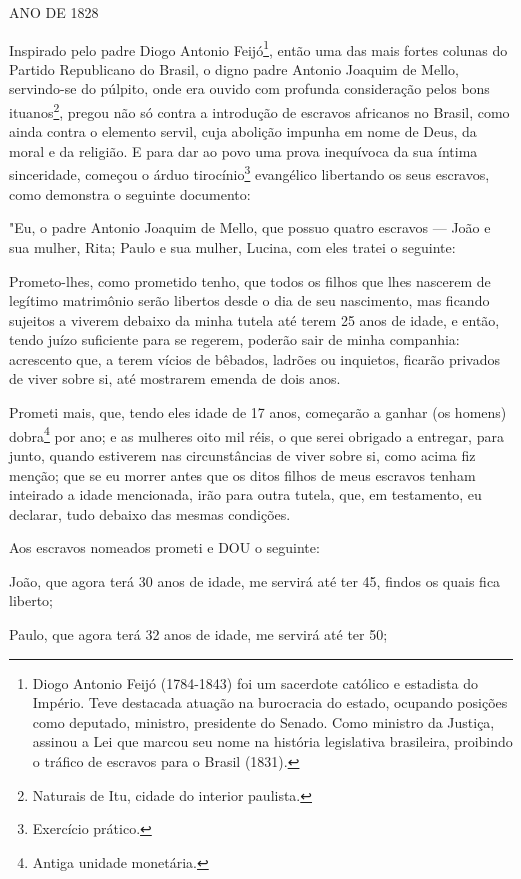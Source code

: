 ANO DE 1828

Inspirado pelo padre Diogo Antonio Feijó\footnote{Diogo Antonio Feijó
  (1784-1843) foi um sacerdote católico e estadista do Império. Teve
  destacada atuação na burocracia do estado, ocupando posições como
  deputado, ministro, presidente do Senado. Como ministro da Justiça,
  assinou a Lei que marcou seu nome na história legislativa brasileira,
  proibindo o tráfico de escravos para o Brasil (1831).}, então uma das
mais fortes colunas do Partido Republicano do Brasil, o digno padre
Antonio Joaquim de Mello, servindo-se do púlpito, onde era ouvido com
profunda consideração pelos bons ituanos\footnote{Naturais de Itu,
  cidade do interior paulista.}, pregou não só contra a introdução de
escravos africanos no Brasil, como ainda contra o elemento servil, cuja
abolição impunha em nome de Deus, da moral e da religião. E para dar ao
povo uma prova inequívoca da sua íntima sinceridade, começou o árduo
tirocínio\footnote{Exercício prático.} evangélico libertando os seus
escravos, como demonstra o seguinte documento:

"Eu, o padre Antonio Joaquim de Mello, que possuo quatro escravos ---
João e sua mulher, Rita; Paulo e sua mulher, Lucina, com eles tratei o
seguinte:

Prometo-lhes, como prometido tenho, que todos os filhos que lhes
nascerem de legítimo matrimônio serão libertos desde o dia de seu
nascimento, mas ficando sujeitos a viverem debaixo da minha tutela até
terem 25 anos de idade, e então, tendo juízo suficiente para se regerem,
poderão sair de minha companhia: acrescento que, a terem vícios de
bêbados, ladrões ou inquietos, ficarão privados de viver sobre si, até
mostrarem emenda de dois anos.

Prometi mais, que, tendo eles idade de 17 anos, começarão a ganhar (os
homens) dobra\footnote{Antiga unidade monetária.} por ano; e as
mulheres oito mil réis, o que serei obrigado a entregar, para junto,
quando estiverem nas circunstâncias de viver sobre si, como acima fiz
menção; que se eu morrer antes que os ditos filhos de meus escravos
tenham inteirado a idade mencionada, irão para outra tutela, que, em
testamento, eu declarar, tudo debaixo das mesmas condições.

Aos escravos nomeados prometi e DOU o seguinte:

João, que agora terá 30 anos de idade, me servirá até ter 45, findos os
quais fica liberto;

Paulo, que agora terá 32 anos de idade, me servirá até ter 50;

